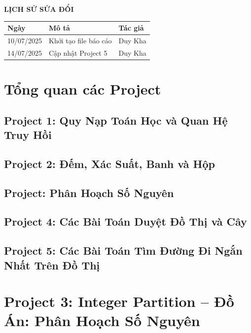 \documentclass[12pt,a4paper]{article}
\begin{document}
\begin{center}
{\Huge\bfseries LỊCH SỬ SỬA ĐỔI\par}
\end{center}

\renewcommand{\arraystretch}{1.5}
\begin{center}
\begin{longtable}{|p{3cm}|p{8cm}|p{3cm}|}
\hline
\textbf{Ngày} & \textbf{Mô tả} & \textbf{Tác giả} \\
\hline
\endhead
10/07/2025 & Khởi tạo file báo cáo & Duy Kha\\
\hline
14/07/2025 & Cập nhật Project 5 & Duy Kha\\
\hline
\end{longtable}
\end{center}

\newpage
\tableofcontents

\newpage

\section{Tổng quan các Project}

\subsection{Project 1: Quy Nạp Toán Học và Quan Hệ Truy Hồi}

\subsection{Project 2: Đếm, Xác Suất, Banh và Hộp}

\subsection{Project: Phân Hoạch Số Nguyên}

\subsection{Project 4: Các Bài Toán Duyệt Đồ Thị và Cây}

\subsection{Project 5: Các Bài Toán Tìm Đường Đi Ngắn Nhất Trên Đồ Thị}

\newpage

\section{Project 3:  Integer Partition – Đồ Án: Phân Hoạch Số Nguyên}
\end{document}
